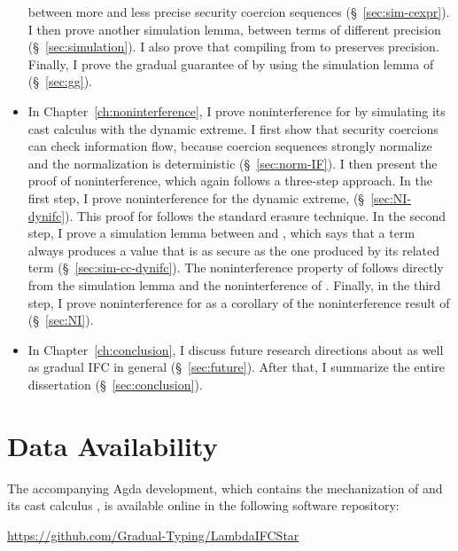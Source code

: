 \begin{itemize}
    between more and less precise security coercion sequences
    (\S~\ref{sec:sim-cexpr}). I then prove another simulation lemma, between \CC
    terms of different precision (\S~\ref{sec:simulation}). I also prove that
    compiling from \Surface to \CC preserves precision. Finally, I prove the
    gradual guarantee of \Surface by using the simulation lemma of \CC
    (\S~\ref{sec:gg}).
  \item In Chapter~\ref{ch:noninterference}, I prove noninterference for
    \Surface by simulating its cast calculus with the dynamic extreme. I first
    show that security coercions can check information flow, because coercion
    sequences strongly normalize and the normalization is deterministic
    (\S~\ref{sec:norm-IF}). I then present the proof of noninterference, which
    again follows a three-step approach. In the first step, I prove
    noninterference for the dynamic extreme, \DynIFC (\S~\ref{sec:NI-dynifc}).
    This proof for \DynIFC follows the standard erasure technique. In the second
    step, I prove a simulation lemma between \CC and \DynIFC, which says that a
    \CC term always produces a value that is as secure as the one produced by
    its related \DynIFC term (\S~\ref{sec:sim-cc-dynifc}). The noninterference
    property of \CC follows directly from the simulation lemma and the
    noninterference of \DynIFC. Finally, in the third step, I prove
    noninterference for \Surface as a corollary of the noninterference result of
    \CC (\S~\ref{sec:NI}).
  \item In Chapter~\ref{ch:conclusion}, I discuss future research directions
    about \Surface as well as gradual IFC in general (\S~\ref{sec:future}).
    After that, I summarize the entire dissertation (\S~\ref{sec:conclusion}).
\end{itemize}

\section{Data Availability}

The accompanying Agda development, which contains the mechanization of \Surface and its
cast calculus \CC, is available online in the following software repository:
\begin{center}
  \large
  \url{https://github.com/Gradual-Typing/LambdaIFCStar}
\end{center}
